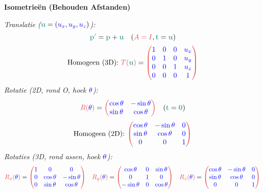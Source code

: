 \documentclass[12pt]{article}
\renewcommand{\vec}[1]{\textcolor{vectorTeal}{\mathbf{#1}}}
\newcommand{\scalar}[1]{\textcolor{scalarBrightBlue}{#1}}
\newcommand{\mat}[1]{\textcolor{matrixSoftRed}{#1}}
\begin{document}
\vspace{1.5em} %
{\centering
\textcolor{headerBrown}{\large\textbf{Isometrieën (Behouden Afstanden)}}
\par
}%
\textit{Translatie ($\vec{u} = (\scalar{u_x, u_y, u_z})$):}
\[
\vec{p'} = \vec{p} + \vec{u}
\quad (\mat{A=I}, \vec{t}=\vec{u})
\]
\[
\text{Homogeen (3D): } \mat{T(\vec{u})} = \mat{\begin{pmatrix} \scalar{1} & \scalar{0} & \scalar{0} & \scalar{u_x} \\ \scalar{0} & \scalar{1} & \scalar{0} & \scalar{u_y} \\ \scalar{0} & \scalar{0} & \scalar{1} & \scalar{u_z} \\ \scalar{0} & \scalar{0} & \scalar{0} & \scalar{1} \end{pmatrix}}
\]
\textit{Rotatie (2D, rond O, hoek $\scalar{\theta}$):}
\[
\mat{R(\scalar{\theta})} = \mat{\begin{pmatrix} \scalar{\cos\theta} & \scalar{-\sin\theta} \\ \scalar{\sin\theta} & \scalar{\cos\theta} \end{pmatrix}}
\quad (\vec{t}=\vec{0})
\]
\[
\text{Homogeen (2D): } \mat{\begin{pmatrix} \scalar{\cos\theta} & \scalar{-\sin\theta} & \scalar{0} \\ \scalar{\sin\theta} & \scalar{\cos\theta} & \scalar{0} \\ \scalar{0} & \scalar{0} & \scalar{1} \end{pmatrix}}
\]
\textit{Rotaties (3D, rond assen, hoek $\scalar{\theta}$):}
\[
\mat{R_x(\scalar{\theta})} = \mat{\begin{pmatrix} \scalar{1} & \scalar{0} & \scalar{0} \\ \scalar{0} & \scalar{\cos\theta} & \scalar{-\sin\theta} \\ \scalar{0} & \scalar{\sin\theta} & \scalar{\cos\theta} \end{pmatrix}}
\quad
\mat{R_y(\scalar{\theta})} = \mat{\begin{pmatrix} \scalar{\cos\theta} & \scalar{0} & \scalar{\sin\theta} \\ \scalar{0} & \scalar{1} & \scalar{0} \\ \scalar{-\sin\theta} & \scalar{0} & \scalar{\cos\theta} \end{pmatrix}}
\quad
\mat{R_z(\scalar{\theta})} = \mat{\begin{pmatrix} \scalar{\cos\theta} & \scalar{-\sin\theta} & \scalar{0} \\ \scalar{\sin\theta} & \scalar{\cos\theta} & \scalar{0} \\ \scalar{0} & \scalar{0} & \scalar{1} \end{pmatrix}}
\]
\end{document}
